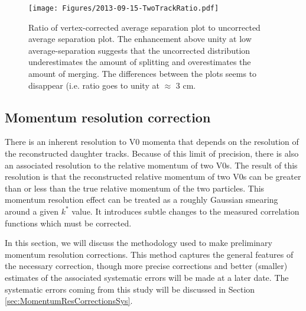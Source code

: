 \begin{figure}[hbtp]
\texttt{[image: Figures/2013-09-15-TwoTrackRatio.pdf]}
\caption[Ratio of corrected/uncorrected average-separation distributions]{Ratio of vertex-corrected average separation plot to uncorrected average separation plot.  The enhancement above unity at low average-separation suggests that the uncorrected distribution underestimates the amount of splitting and overestimates the amount of merging.  The differences between the plots seems to disappear (i.e. ratio goes to unity at $\approx$ 3 cm.}
\label{fig:TwoTrackRatio}
\end{figure}

\subsection{Momentum resolution correction}
\label{sec:MomentumResCorrection}

There is an inherent resolution to V0 momenta that depends on the resolution of the reconstructed daughter tracks.  Because of this limit of precision, there is also an associated resolution to the relative momentum of two V0s.  The result of this resolution is that the reconstructed relative momentum of two V0s can be greater than or less than the true relative momentum of the two particles.  This momentum resolution effect can be treated as a roughly Gaussian smearing around a given $k^*$ value.  It introduces subtle changes to the measured correlation functions which must be corrected.

In this section, we will discuss the methodology used to make preliminary momentum resolution corrections.  This method captures the general features of the necessary correction, though more precise corrections and better (smaller) estimates of the associated systematic errors will be made at a later date.  The systematic errors coming from this study will be discussed in Section \ref{sec:MomentumResCorrectionsSys}.

